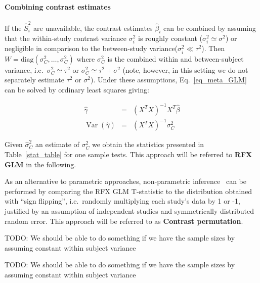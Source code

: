 \documentclass[preprint]{elsarticle}
\DeclareMathOperator{\Var}{Var}
\newcommand{\effectvector}{\hat\beta}
\newcommand{\effect}[1][i]{\effectvector_{#1}}
\newcommand{\vareffect}[1][i]{\hat S^2_{#1}}
\newcommand{\varCombined}{\sigma^2_{C}}
\newcommand{\estvarCombined}{\hat\sigma^2_{C}}
\newcommand{\metaanalyticeffect}{\gamma}
\newcommand{\varBetween}{\tau^2}
\newcommand{\varWithinCommon}{\sigma^2}
\newcommand{\varWithin}[1][i]{\sigma^2_{#1}}
\newcommand{\transpose}{^T}
\begin{document}
\paragraph{Combining contrast estimates}
If the $\vareffect$ are unavailable, the contrast estimates $\effect$ can be combined by assuming that the within-study contrast variance $\varWithin$ is roughly constant ($\varWithin \simeq \sigma^2$) or negligible in comparison to the between-study variance($\varWithin \ll \varBetween$). Then $W = \mathrm{diag}( \varCombined, \ldots, \varCombined )$ where $\varCombined$ is the combined within and between-subject variance, i.e.\ $\varCombined \simeq \varBetween$ or $\varCombined \simeq \varBetween + \varWithinCommon$ (note, however, in this setting we do not separately estimate $\varBetween$ or $\varWithinCommon$). Under these assumptions, Eq.~\eqref{eq_meta_GLM} can be solved by ordinary least squares giving:

\begin{eqnarray}
	\hat \metaanalyticeffect  &=& (X\transpose X)^{-1} X\transpose \effectvector \\
	\Var(\hat \metaanalyticeffect)  &=& (X\transpose X)^{-1} \varCombined
	\label{eq_OLS}
\end{eqnarray}

Given $\estvarCombined$ an estimate of $\varCombined$ we obtain the statistics presented in Table~\ref{stat_table} for one sample tests. This approach will be referred to \textbf{RFX GLM} in the following.

As an alternative to parametric approaches, non-parametric inference~\cite{Holmes1996,Nichols2002} can be performed by comparing the RFX GLM T-statistic to the distribution obtained with ``sign flipping'', i.e.\ randomly multiplying each study's data by 1 or -1, justified by an assumption of independent studies and symmetrically distributed random error. This approach will be referred to as \textbf{Contrast permutation}.

TODO: We should be able to do something if we have the sample sizes by assuming constant within subject variance

TODO: We should be able to do something if we have the sample sizes by assuming constant within subject variance
\end{document}
